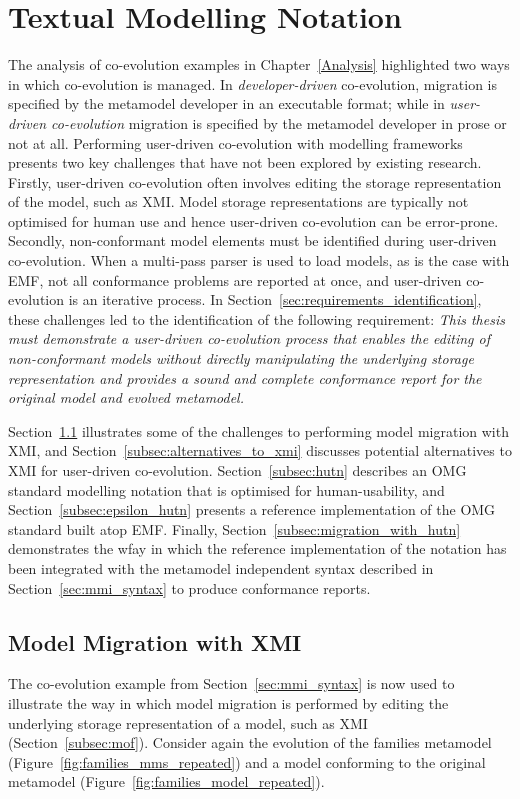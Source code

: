 
\section{Textual Modelling Notation}
\label{sec:notation}
The analysis of co-evolution examples in Chapter~\ref{Analysis} highlighted two ways in which co-evolution is managed. In \emph{developer-driven} co-evolution, migration is specified by the metamodel developer in an executable format; while in \emph{user-driven co-evolution} migration is specified by the metamodel developer in prose or not at all. Performing user-driven co-evolution with modelling frameworks presents two key challenges that have not been explored by existing research. Firstly, user-driven co-evolution often involves editing the storage representation of the model, such as XMI. Model storage representations are typically not optimised for human use and hence user-driven co-evolution can be error-prone. Secondly, non-conformant model elements must be identified during user-driven co-evolution. When a multi-pass parser is used to load models, as is the case with EMF, not all conformance problems are reported at once, and user-driven co-evolution is an iterative process. In Section~\ref{sec:requirements_identification}, these challenges led to the identification of the following requirement: \emph{This thesis must demonstrate a user-driven co-evolution process that enables the editing of non-conformant models without directly manipulating the underlying storage representation and provides a sound and complete conformance report for the original model and evolved metamodel.}

Section~\ref{subsec:migration_with_xmi} illustrates some of the challenges to performing model migration with XMI, and Section~\ref{subsec:alternatives_to_xmi} discusses potential alternatives to XMI for user-driven co-evolution. Section~\ref{subsec:hutn} describes an OMG standard modelling notation that is optimised for human-usability, and Section~\ref{subsec:epsilon_hutn} presents a reference implementation of the OMG standard built atop EMF. Finally, Section~\ref{subsec:migration_with_hutn} demonstrates the wƒay in which the reference implementation of the notation has been integrated with the metamodel independent syntax described in Section~\ref{sec:mmi_syntax} to produce conformance reports. 

\subsection{Model Migration with XMI}
\label{subsec:migration_with_xmi}
The co-evolution example from Section~\ref{sec:mmi_syntax} is now used to illustrate the way in which model migration is performed by editing the underlying storage representation of a model, such as XMI (Section~\ref{subsec:mof}). Consider again the evolution of the families metamodel (Figure~\ref{fig:families_mms_repeated}) and a model conforming to the original metamodel (Figure~\ref{fig:families_model_repeated}).

